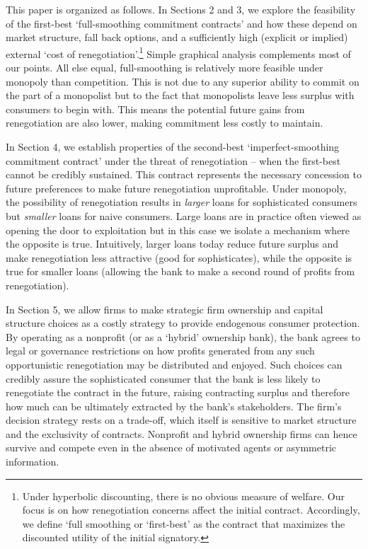 \documentclass[11pt,english]{article}
\theoremstyle{plain}
\theoremstyle{definition}
\begin{document}
This paper is organized as follows. In Sections 2 and 3, we  explore
the feasibility of the first-best `full-smoothing commitment contracts'
and  how these depend on market structure, fall back options, and a sufficiently high (explicit or implied) external
`cost of renegotiation'.\footnote{Under hyperbolic discounting, there is no obvious measure of welfare.
Our focus is on how renegotiation concerns affect the initial contract.
Accordingly, we define `full smoothing or `first-best' as the contract
that maximizes the discounted utility of the initial signatory.} Simple graphical analysis  complements most of our points.
All else equal, full-smoothing is relatively more feasible
under monopoly than competition. This is not due to any superior
ability to commit on the part of a monopolist but to the fact that monopolists leave less surplus with consumers to begin with. This means the potential
future gains from renegotiation are also lower, making commitment less costly to maintain.

In Section 4, we establish properties of the second-best `imperfect-smoothing
commitment contract' under the threat of renegotiation -- when the first-best
cannot be credibly sustained. This contract represents the necessary concession to future preferences  to make future renegotiation
unprofitable. Under monopoly, the possibility of renegotiation results
in \emph{larger} loans for sophisticated consumers but \emph{smaller}
loans for naive consumers. Large loans are in practice often viewed
as opening the door to exploitation but in this case we isolate a
mechanism where the opposite is true. Intuitively, larger loans today
reduce future surplus and make renegotiation less attractive (good
for sophisticates), while the opposite is true for smaller loans (allowing
the bank to make a second round of profits from renegotiation). 

In Section 5, we allow firms to make strategic firm ownership and capital structure choices as a costly strategy to provide
endogenous consumer protection. By operating as a nonprofit
(or as a `hybrid' ownership bank), the bank agrees to legal or governance
restrictions on how profits generated from any such opportunistic
renegotiation may be distributed and enjoyed. Such choices can credibly
assure the sophisticated consumer that the bank is less likely to
renegotiate the contract in the future, raising contracting surplus
and therefore how much can be ultimately extracted by the bank's stakeholders.
The firm's decision strategy
rests on a trade-off, which itself is sensitive to market structure
and the exclusivity of contracts. Nonprofit and hybrid ownership firms can hence survive
and compete even in the absence of motivated agents or asymmetric information.
\end{document}
